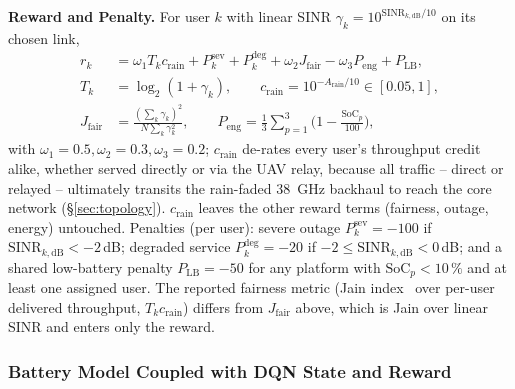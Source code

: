 \documentclass[]{ieeeaccess}
\begin{document}
\textbf{Reward and Penalty.} For user $k$ with linear SINR $\gamma_k=10^{\mathrm{SINR}_{k,\mathrm{dB}}/10}$ on its chosen link,
\begin{align}
r_k &= \omega_1 T_k c_\mathrm{rain} + P^\mathrm{sev}_k + P^\mathrm{deg}_k + \omega_2 J_\mathrm{fair} - \omega_3 P_\mathrm{eng} + P_\mathrm{LB},\nonumber\\
T_k &= \log_2(1+\gamma_k), \qquad c_\mathrm{rain}=10^{-A_\mathrm{rain}/10}\in[0.05,1],\nonumber\\
J_\mathrm{fair} &= \frac{(\sum_k\gamma_k)^2}{N\sum_k\gamma_k^2}, \qquad P_\mathrm{eng}=\frac{1}{3}\sum_{p=1}^3\Big(1-\frac{\mathrm{SoC}_p}{100}\Big),
\label{eq:reward}
\end{align}
with $\omega_1=0.5,\omega_2=0.3,\omega_3=0.2$; $c_\mathrm{rain}$ de-rates every user's throughput credit alike, whether served directly or via the UAV relay, because all traffic -- direct or relayed -- ultimately transits the rain-faded 38~GHz backhaul to reach the core network (\S\ref{sec:topology}). $c_\mathrm{rain}$ leaves the other reward terms (fairness, outage, energy) untouched. Penalties (per user): severe outage $P^\mathrm{sev}_k=-100$ if $\mathrm{SINR}_{k,\mathrm{dB}}<-2$\,dB; degraded service $P^\mathrm{deg}_k=-20$ if $-2\le\mathrm{SINR}_{k,\mathrm{dB}}<0$\,dB; and a shared low-battery penalty $P_\mathrm{LB}=-50$ for any platform with $\mathrm{SoC}_p<10\,\%$ and at least one assigned user. The reported fairness metric (Jain index~\cite{jain1984quantitative} over per-user delivered throughput, $T_kc_\mathrm{rain}$) differs from $J_\mathrm{fair}$ above, which is Jain over linear SINR and enters only the reward.

\subsubsection{Battery Model Coupled with DQN State and Reward}
\label{subsec:battery}
\end{document}
